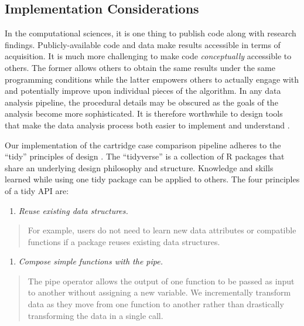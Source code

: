 \documentclass[11pt,]{isuthesis}
\providecommand{\tightlist}{%
  \setlength{\itemsep}{0pt}\setlength{\parskip}{0pt}}
\begin{document}
\hypertarget{implementation-considerations}{%
\subsection{Implementation Considerations}\label{implementation-considerations}}

In the computational sciences, it is one thing to publish code along with research findings.
Publicly-available code and data make results accessible in terms of acquisition.
It is much more challenging to make code \emph{conceptually} accessible to others.
The former allows others to obtain the same results under the same programming conditions while the latter empowers others to actually engage with and potentially improve upon individual pieces of the algorithm.
In any data analysis pipeline, the procedural details may be obscured as the goals of the analysis become more sophisticated.
It is therefore worthwhile to design tools that make the data analysis process both easier to implement and understand \citep{tidy-data}.

Our implementation of the cartridge case comparison pipeline adheres to the ``tidy'' principles of design \citep{tidyverse}.
The ``tidyverse'' is a collection of R packages that share an underlying design philosophy and structure.
Knowledge and skills learned while using one tidy package can be applied to others.
The four principles of a tidy API are:

\begin{enumerate}
\def\labelenumi{\arabic{enumi}.}
\tightlist
\item
  \emph{Reuse existing data structures.}
\end{enumerate}

\begin{quote}
For example, users do not need to learn new data attributes or compatible functions if a package reuses existing data structures.
\end{quote}

\begin{enumerate}
\def\labelenumi{\arabic{enumi}.}
\setcounter{enumi}{1}
\tightlist
\item
  \emph{Compose simple functions with the pipe.}
\end{enumerate}

\begin{quote}
The pipe operator allows the output of one function to be passed as input to another without assigning a new variable. We incrementally transform data as they move from one function to another rather than drastically transforming the data in a single call.
\end{quote}
\end{document}
